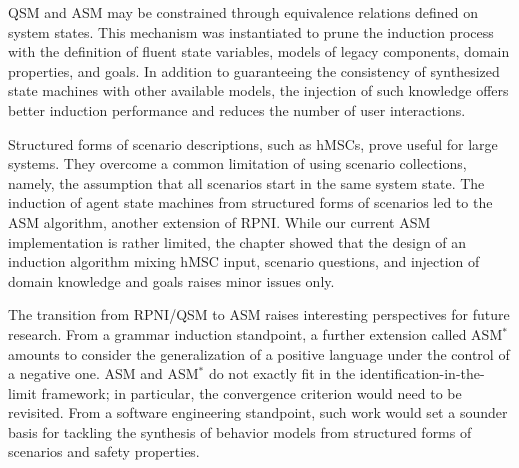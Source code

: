 QSM and ASM may be constrained through equivalence relations defined on system states. This mechanism was instantiated to prune the induction process with the definition of fluent state variables, models of legacy components, domain properties, and goals. In addition to guaranteeing the consistency of synthesized state machines with other available models, the injection of such knowledge offers better induction performance and reduces the number of user interactions.

Structured forms of scenario descriptions, such as hMSCs, prove useful for large systems. They overcome a common limitation of using scenario collections, namely, the assumption that all scenarios start in the same system state. The induction of agent state machines from structured forms of scenarios led to the ASM algorithm, another extension of RPNI. While our current ASM implementation is rather limited, the chapter showed that the design of an induction algorithm mixing hMSC input, scenario questions, and injection of domain knowledge and goals raises minor issues only.

The transition from RPNI/QSM to ASM raises interesting perspectives for future research. From a grammar induction standpoint, a further extension called ASM$^*$ amounts to consider the generalization of a positive language under the control of a negative one. ASM and ASM$^*$ do not exactly fit in the identification-in-the-limit framework; in particular, the convergence criterion would need to be revisited. From a software engineering standpoint, such work would set a sounder basis for tackling the synthesis of behavior models from structured forms of scenarios and safety properties.
